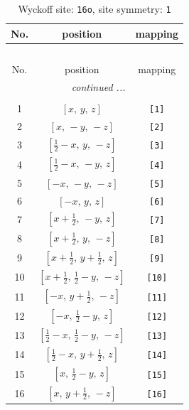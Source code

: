 \documentclass[fleqn,8pt]{jsarticle}
\begin{document}
\begin{longtable}{ccc}
\caption{Wyckoff site: {\tt 16o}, site symmetry: {\tt 1}}
 \\
 \hline \hline
No. & position & mapping \\ \hline \endfirsthead

\multicolumn{2}{l}{\tablename\ \thetable{}} \\
 \hline \hline
No. & position & mapping \\ \hline \endhead

 \hline \hline
\multicolumn{2}{r}{\footnotesize\it continued ...} \\ \endfoot

 \hline \hline
\multicolumn{2}{r}{} \\ \endlastfoot

1 & $\left[ x,\, y,\, z \right]$ & {\tt [1]} \\ \hline
2 & $\left[ x,\, - y,\, - z \right]$ & {\tt [2]} \\ \hline
3 & $\left[ \frac{1}{2} - x,\, y,\, - z \right]$ & {\tt [3]} \\ \hline
4 & $\left[ \frac{1}{2} - x,\, - y,\, z \right]$ & {\tt [4]} \\ \hline
5 & $\left[ - x,\, - y,\, - z \right]$ & {\tt [5]} \\ \hline
6 & $\left[ - x,\, y,\, z \right]$ & {\tt [6]} \\ \hline
7 & $\left[ x + \frac{1}{2},\, - y,\, z \right]$ & {\tt [7]} \\ \hline
8 & $\left[ x + \frac{1}{2},\, y,\, - z \right]$ & {\tt [8]} \\ \hline
9 & $\left[ x + \frac{1}{2},\, y + \frac{1}{2},\, z \right]$ & {\tt [9]} \\ \hline
10 & $\left[ x + \frac{1}{2},\, \frac{1}{2} - y,\, - z \right]$ & {\tt [10]} \\ \hline
11 & $\left[ - x,\, y + \frac{1}{2},\, - z \right]$ & {\tt [11]} \\ \hline
12 & $\left[ - x,\, \frac{1}{2} - y,\, z \right]$ & {\tt [12]} \\ \hline
13 & $\left[ \frac{1}{2} - x,\, \frac{1}{2} - y,\, - z \right]$ & {\tt [13]} \\ \hline
14 & $\left[ \frac{1}{2} - x,\, y + \frac{1}{2},\, z \right]$ & {\tt [14]} \\ \hline
15 & $\left[ x,\, \frac{1}{2} - y,\, z \right]$ & {\tt [15]} \\ \hline
16 & $\left[ x,\, y + \frac{1}{2},\, - z \right]$ & {\tt [16]} \\
\end{longtable}
\end{document}
